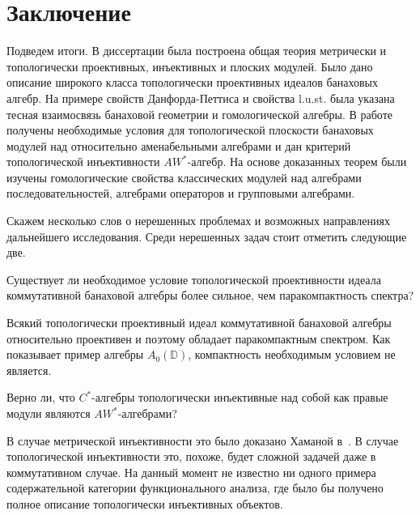\chapter*{Заключение}						

Подведем итоги. В диссертации была построена общая теория метрически и
топологически проективных, инъективных и плоских модулей. Было дано описание
широкого класса топологически проективных идеалов банаховых алгебр. На примере
свойств Данфорда-Петтиса и свойства l.u.st. была указана тесная взаимосвязь
банаховой геометрии и гомологической алгебры. В работе получены необходимые
условия для топологической плоскости банаховых модулей над относительно
аменабельными алгебрами и дан критерий топологической инъективности
$AW^*$-алгебр. На основе доказанных теорем были изучены гомологические свойства
классических модулей над алгебрами последовательностей, алгебрами операторов и
групповыми алгебрами.

Скажем несколько слов о нерешенных проблемах и возможных направлениях
дальнейшего исследования. Среди нерешенных задач стоит отметить следующие две.

\begin{problem*} Существует ли необходимое условие топологической проективности
идеала коммутативной банаховой алгебры более сильное, чем паракомпактность
спектра?
\end{problem*}

Всякий топологически проективный идеал коммутативной банаховой алгебры
относительно проективен и поэтому обладает паракомпактным спектром. Как
показывает пример алгебры $A_0(\mathbb{D})$, компактность необходимым условием
не является.

\begin{problem*} Верно ли, что $C^*$-алгебры топологически инъективные над собой
как правые модули являются $AW^*$-алгебрами?
\end{problem*}

В случае метрической инъективности это было доказано Хаманой
в~\cite{HamInjEnvBanMod}. В случае топологической инъективности это, похоже,
будет сложной задачей даже в коммутативном случае. На данный момент не известно
ни одного примера содержательной категории функционального анализа, где было бы
получено полное описание топологически инъективных объектов.

